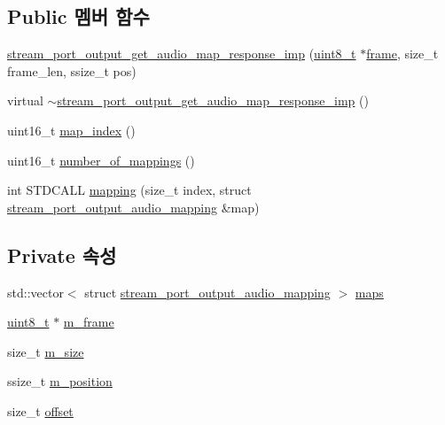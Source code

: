 \subsection*{Public 멤버 함수}
\begin{DoxyCompactItemize}
\item 
\hyperlink{classavdecc__lib_1_1stream__port__output__get__audio__map__response__imp_aa1d6387589507c7969b74d8a72943106}{stream\+\_\+port\+\_\+output\+\_\+get\+\_\+audio\+\_\+map\+\_\+response\+\_\+imp} (\hyperlink{stdint_8h_aba7bc1797add20fe3efdf37ced1182c5}{uint8\+\_\+t} $\ast$\hyperlink{gst__avb__playbin_8c_ac8e710e0b5e994c0545d75d69868c6f0}{frame}, size\+\_\+t frame\+\_\+len, ssize\+\_\+t pos)
\item 
virtual \hyperlink{classavdecc__lib_1_1stream__port__output__get__audio__map__response__imp_a03690ffbe6ce2477e3944ce3be7baf10}{$\sim$stream\+\_\+port\+\_\+output\+\_\+get\+\_\+audio\+\_\+map\+\_\+response\+\_\+imp} ()
\item 
uint16\+\_\+t \hyperlink{classavdecc__lib_1_1stream__port__output__get__audio__map__response__imp_a2fdcf4d2f53407b6a6b165ec04b38b25}{map\+\_\+index} ()
\item 
uint16\+\_\+t \hyperlink{classavdecc__lib_1_1stream__port__output__get__audio__map__response__imp_a3928eb3903b4e082cbc7d6d29146aabd}{number\+\_\+of\+\_\+mappings} ()
\item 
int S\+T\+D\+C\+A\+LL \hyperlink{classavdecc__lib_1_1stream__port__output__get__audio__map__response__imp_a5fbf91a7fe7089a42b131c7392383b37}{mapping} (size\+\_\+t index, struct \hyperlink{structavdecc__lib_1_1stream__port__output__audio__mapping}{stream\+\_\+port\+\_\+output\+\_\+audio\+\_\+mapping} \&map)
\end{DoxyCompactItemize}
\subsection*{Private 속성}
\begin{DoxyCompactItemize}
\item 
std\+::vector$<$ struct \hyperlink{structavdecc__lib_1_1stream__port__output__audio__mapping}{stream\+\_\+port\+\_\+output\+\_\+audio\+\_\+mapping} $>$ \hyperlink{classavdecc__lib_1_1stream__port__output__get__audio__map__response__imp_a973b7d4514c80489a2d8bf42114bb799}{maps}
\item 
\hyperlink{stdint_8h_aba7bc1797add20fe3efdf37ced1182c5}{uint8\+\_\+t} $\ast$ \hyperlink{classavdecc__lib_1_1stream__port__output__get__audio__map__response__imp_a50417969cf438e7c8d698726bbbe2ff9}{m\+\_\+frame}
\item 
size\+\_\+t \hyperlink{classavdecc__lib_1_1stream__port__output__get__audio__map__response__imp_a0dc3c363255f193681c77b4d2a82e995}{m\+\_\+size}
\item 
ssize\+\_\+t \hyperlink{classavdecc__lib_1_1stream__port__output__get__audio__map__response__imp_af5e691c4a8a0feb07f48440b321206cd}{m\+\_\+position}
\item 
size\+\_\+t \hyperlink{classavdecc__lib_1_1stream__port__output__get__audio__map__response__imp_aadb6d6eb83e646653a1402032e45dcab}{offset}
\end{DoxyCompactItemize}


